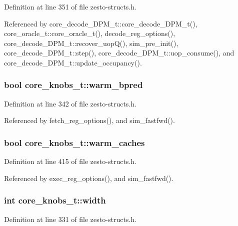 Definition at line 351 of file zesto-structs.h.

Referenced by core\_\-decode\_\-DPM\_\-t::core\_\-decode\_\-DPM\_\-t(), core\_\-oracle\_\-t::core\_\-oracle\_\-t(), decode\_\-reg\_\-options(), core\_\-decode\_\-DPM\_\-t::recover\_\-uopQ(), sim\_\-pre\_\-init(), core\_\-decode\_\-DPM\_\-t::step(), core\_\-decode\_\-DPM\_\-t::uop\_\-consume(), and core\_\-decode\_\-DPM\_\-t::update\_\-occupancy().
\subsubsection[{warm\_\-bpred}]{\setlength{\rightskip}{0pt plus 5cm}bool {\bf core\_\-knobs\_\-t::warm\_\-bpred}}\label{structcore__knobs__t_9a4506be3b2e4d386b6cd3c889810043}




Definition at line 342 of file zesto-structs.h.

Referenced by fetch\_\-reg\_\-options(), and sim\_\-fastfwd().
\subsubsection[{warm\_\-caches}]{\setlength{\rightskip}{0pt plus 5cm}bool {\bf core\_\-knobs\_\-t::warm\_\-caches}}\label{structcore__knobs__t_854336fff6e30b4d81f39378d9e7b2d6}




Definition at line 415 of file zesto-structs.h.

Referenced by exec\_\-reg\_\-options(), and sim\_\-fastfwd().
\subsubsection[{width}]{\setlength{\rightskip}{0pt plus 5cm}int {\bf core\_\-knobs\_\-t::width}}\label{structcore__knobs__t_b58b777420f6904e072325942a0c2415}




Definition at line 331 of file zesto-structs.h.

